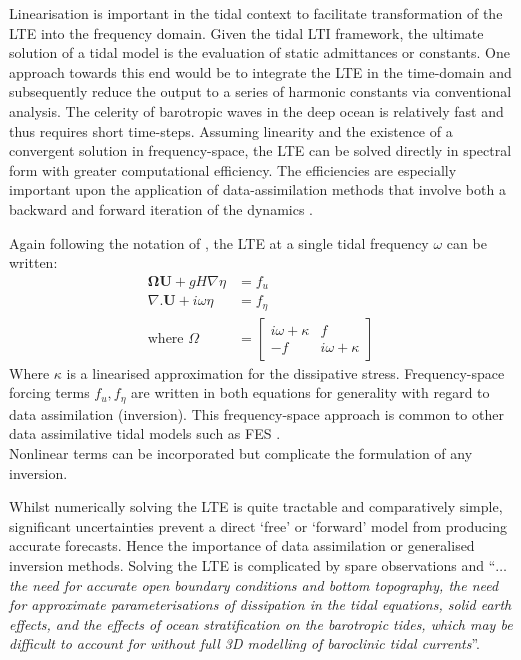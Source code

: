 Linearisation is important in the tidal context to facilitate transformation of the LTE into the frequency domain.   Given the tidal LTI framework, the ultimate solution of a tidal model is the evaluation of static admittances or constants.   One approach towards this end would be to integrate the LTE in the time-domain and subsequently reduce the output to a series of harmonic constants via conventional analysis.   The celerity of barotropic waves in the deep ocean is relatively fast and thus requires short time-steps.   Assuming linearity and the existence of a convergent solution in frequency-space, the LTE can be solved directly in spectral form with greater computational efficiency.   The efficiencies are especially important upon the application of data-assimilation methods that involve both a backward and forward iteration of the dynamics \cite[pp184]{Egbert:2002ug}.


Again following the notation of \cite[pp186]{Egbert:2002ug}, the LTE at a single tidal frequency $\omega$ can be written:
\begin{align}
    \label{E:LTE_momtm_w}
    \mathbf{\Omega} \mathbf{U} + gH\nabla \eta &= f_u \\
    \label{E:LTE_cont_w}
    \nabla.\mathbf{U} + i\omega\eta &= f_\eta\\
    \mbox{where   } \Omega          &=
    \left[ \begin{array}{cc} 
      i\omega + \kappa & f \\ 
            -f         & i\omega + \kappa  
            \end{array} \right]   \nonumber
\end{align}
Where $\kappa$ is a linearised approximation for the dissipative stress.   Frequency-space forcing terms $f_u, f_\eta$ are written in both equations for generality with regard to data assimilation (inversion).  This frequency-space approach is common to other data assimilative tidal models such as FES \cite[pp395]{Lyard:2006ir}.\\
Nonlinear terms can be incorporated but complicate the formulation of any inversion.


Whilst numerically solving the LTE is quite tractable and comparatively simple, significant uncertainties prevent a direct `free' or `forward' model from producing accurate forecasts.  Hence the importance of data assimilation or generalised inversion methods.  Solving the LTE is complicated by spare observations and ``\textit{$\dots$ the need for accurate open boundary conditions and bottom topography, the need for approximate parameterisations of dissipation in the tidal equations, solid earth effects, and the effects of ocean stratification on the barotropic tides, which may be difficult to account for without full 3D modelling of baroclinic tidal currents}''\citep[183]{Egbert:2002ug}.

